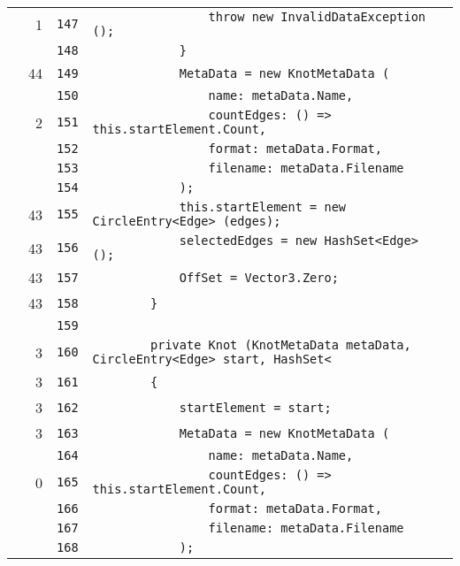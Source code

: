 \documentclass[a4paper,10pt]{article}
\begin{document}
\begin{longtable}[l]{lrrl}
\cellcolor{green} & 1 & \verb~147~ & \verb~                throw new InvalidDataException ();~\\
\cellcolor{gray} &  & \verb~148~ & \verb~            }~\\
\cellcolor{green} & 44 & \verb~149~ & \verb~            MetaData = new KnotMetaData (~\\
\cellcolor{gray} &  & \verb~150~ & \verb~                name: metaData.Name,~\\
\cellcolor{green} & 2 & \verb~151~ & \verb~                countEdges: () => this.startElement.Count,~\\
\cellcolor{gray} &  & \verb~152~ & \verb~                format: metaData.Format,~\\
\cellcolor{gray} &  & \verb~153~ & \verb~                filename: metaData.Filename~\\
\cellcolor{gray} &  & \verb~154~ & \verb~            );~\\
\cellcolor{green} & 43 & \verb~155~ & \verb~            this.startElement = new CircleEntry<Edge> (edges);~\\
\cellcolor{green} & 43 & \verb~156~ & \verb~            selectedEdges = new HashSet<Edge> ();~\\
\cellcolor{green} & 43 & \verb~157~ & \verb~            OffSet = Vector3.Zero;~\\
\cellcolor{green} & 43 & \verb~158~ & \verb~        }~\\
\cellcolor{gray} &  & \verb~159~ & \verb~~\\
\cellcolor{green} & 3 & \verb~160~ & \verb~        private Knot (KnotMetaData metaData, CircleEntry<Edge> start, HashSet<~\\
\cellcolor{green} & 3 & \verb~161~ & \verb~        {~\\
\cellcolor{green} & 3 & \verb~162~ & \verb~            startElement = start;~\\
\cellcolor{green} & 3 & \verb~163~ & \verb~            MetaData = new KnotMetaData (~\\
\cellcolor{gray} &  & \verb~164~ & \verb~                name: metaData.Name,~\\
\cellcolor{red} & 0 & \verb~165~ & \verb~                countEdges: () => this.startElement.Count,~\\
\cellcolor{gray} &  & \verb~166~ & \verb~                format: metaData.Format,~\\
\cellcolor{gray} &  & \verb~167~ & \verb~                filename: metaData.Filename~\\
\cellcolor{gray} &  & \verb~168~ & \verb~            );~\\

\end{longtable}
\end{document}

